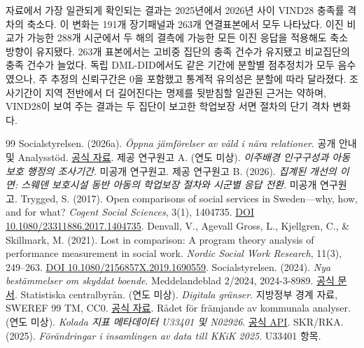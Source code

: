 \documentclass[11pt,a4paper]{article}
\begin{document}
자료에서 가장 일관되게 확인되는 결과는 2025년에서 2026년 사이 VIND28 충족률 격차의 축소다. 이 변화는 191개 장기패널과 263개 연결표본에서 모두 나타났다. 이진 비교가 가능한 288개 시군에서 두 해의 결측에 가능한 모든 이진 응답을 적용해도 축소 방향이 유지됐다. 263개 표본에서는 고비중 집단의 충족 건수가 유지됐고 비교집단의 충족 건수가 늘었다. 독립 DML-DID에서도 같은 기간에 분할별 점추정치가 모두 음수였으나, 주 추정의 신뢰구간은 0을 포함했고 통계적 유의성은 분할에 따라 달라졌다. 조사기간이 지역 전반에서 더 길어진다는 명제를 뒷받침할 일관된 근거는 약하며, VIND28이 보여 주는 결과는 두 집단이 보고한 학업보장 서면 절차의 단기 격차 변화다.

\FloatBarrier
\clearpage
\begingroup{}
\begin{thebibliography}{99}
 Socialstyrelsen. (2026a). \textit{Öppna jämförelser av våld i nära relationer}. 공개 안내 및 Analysstöd. \href{https://www.socialstyrelsen.se/statistik-och-data/oppna-jamforelser/socialtjanst/vald-i-nara-relationer/}{공식 자료}.
 제공 연구원고 A. (연도 미상). \textit{이주배경 인구구성과 아동보호 행정의 조사기간}. 미공개 연구원고.
 제공 연구원고 B. (2026). \textit{집계된 개선의 이면: 스웨덴 보호시설 동반 아동의 학업보장 절차와 시군별 응답 전환}. 미공개 연구원고.
 Trygged, S. (2017). Open comparisons of social services in Sweden---why, how, and for what? \textit{Cogent Social Sciences}, 3(1), 1404735. \href{https://doi.org/10.1080/23311886.2017.1404735}{DOI 10.1080/23311886.2017.1404735}.
 Denvall, V., Agevall Gross, L., Kjellgren, C., \& Skillmark, M. (2021). Lost in comparison: A program theory analysis of performance measurement in social work. \textit{Nordic Social Work Research}, 11(3), 249--263. \href{https://doi.org/10.1080/2156857X.2019.1690559}{DOI 10.1080/2156857X.2019.1690559}.
 Socialstyrelsen. (2024). \textit{Nya bestämmelser om skyddat boende}. Meddelandeblad 2/2024, 2024-3-8989. \href{https://socialstyrelsen.se/publikationer/nya-bestammelser-om-skyddat-boende--meddelandeblad-2024-3-8989/}{공식 문서}.
 Statistiska centralbyrån. (연도 미상). \textit{Digitala gränser}. 지방정부 경계 자료, SWEREF 99 TM, CC0. \href{https://www.scb.se/hitta-statistik/regional-statistik-och-kartor/regionala-indelningar/digitala-granser/}{공식 자료}.
 Rådet för främjande av kommunala analyser. (연도 미상). \textit{Kolada 지표 메타데이터 U33401 및 N02926}. \href{https://api.kolada.se/v3/kpi/U33401,N02926}{공식 API}.
 SKR/RKA. (2025). \textit{Förändringar i insamlingen av data till KKiK 2025}. U33401 항목.

\end{thebibliography}
\end{document}
